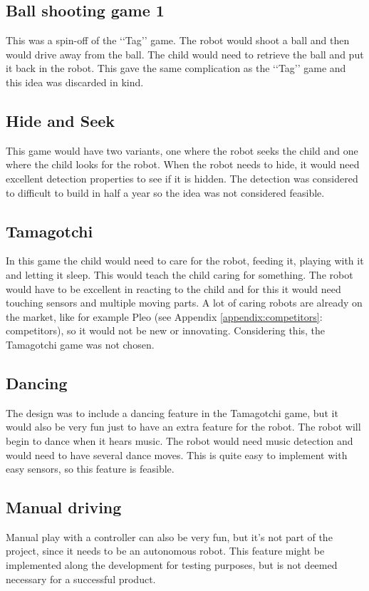\documentclass[11pt,twoside,a4paper]{report}
\begin{document}
\subsection{Ball shooting game 1}
This was a spin-off of the \lq\lq{}Tag\rq\rq{} game. The robot would shoot a ball and then would drive away from the ball. The child would need to retrieve the ball and put it back in the robot. This gave the same complication as the \lq\lq{}Tag\rq\rq{} game and this idea was discarded in kind.
\subsection{Hide and Seek}
This game would have two variants, one where the robot seeks the child and one where the child looks for the robot. When the robot needs to hide, it would need excellent detection properties to see if it is hidden. The detection was considered to difficult to build in half a year so the idea was not considered feasible.
\subsection{Tamagotchi}
In this game the child would need to care for the robot, feeding it, playing with it and letting it sleep. This would teach the child caring for something. The robot would have to be excellent in reacting to the child and for this it would need touching sensors and multiple moving parts. A lot of caring robots are already on the market, like for example Pleo (see Appendix \ref{appendix:competitors}: competitors), so it would not be new or innovating. Considering this, the Tamagotchi game was not chosen.
\subsection{Dancing}
The design was to include a dancing feature in the Tamagotchi game, but it would also be very fun just to have an extra feature for the robot. The robot will begin to dance when it hears music. The robot would need music detection and would need to have several dance moves. This is quite easy to implement with easy sensors, so this feature is feasible.
\subsection{Manual driving}
Manual play with a controller can also be very fun, but it\rq{}s not part of the project, since it needs to be an autonomous robot. This feature might be implemented along the development for testing purposes, but is not deemed necessary for a successful product.
\end{document}

